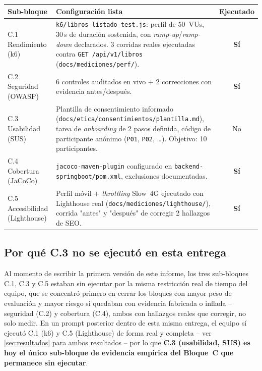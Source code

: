 \documentclass[12pt,a4paper]{article}
\begin{document}
\begin{center}
\small
\begin{tabularx}{\linewidth}{|l|X|c|}
\hline
\rowcolor{verdeuteq}
\color{white}\textbf{Sub-bloque} & \color{white}\textbf{Configuración lista} & \color{white}\textbf{Ejecutado} \\
\hline
C.1 Rendimiento (k6) & \texttt{k6/libros-listado-test.js}: perfil de 50~VUs, 30\,s de duración sostenida, con \emph{ramp-up}/\emph{ramp-down} declarados. 3 corridas reales ejecutadas contra \texttt{GET /api/v1/libros} (\texttt{docs/mediciones/perf/}). & \textbf{Sí} \\
\hline
C.2 Seguridad (OWASP) & 6 controles auditados en vivo + 2 correcciones con evidencia antes/después. & \textbf{Sí} \\
\hline
C.3 Usabilidad (SUS) & Plantilla de consentimiento informado (\texttt{docs/etica/consentimientos/plantilla.md}), tarea de \emph{onboarding} de 2 pasos definida, código de participante anónimo (\texttt{P01}, \texttt{P02}, \ldots). Objetivo: 10 participantes. & No \\
\hline
C.4 Cobertura (JaCoCo) & \texttt{jacoco-maven-plugin} configurado en \texttt{backend-springboot/pom.xml}, exclusiones documentadas. & \textbf{Sí} \\
\hline
C.5 Accesibilidad (Lighthouse) & Perfil móvil + \emph{throttling} Slow~4G ejecutado con Lighthouse real (\texttt{docs/mediciones/lighthouse/}), corrida "antes" y "después" de corregir 2 hallazgos de SEO. & \textbf{Sí} \\
\hline
\end{tabularx}
\end{center}

\subsection{Por qué C.3 no se ejecutó en esta entrega}

Al momento de escribir la primera versión de este informe, los tres
sub-bloques C.1, C.3 y C.5 estaban sin ejecutar por la misma restricción
real de tiempo del equipo, que se concentró primero en cerrar los bloques
con mayor peso de evaluación y mayor riesgo si quedaban con evidencia
fabricada o inflada -- seguridad (C.2) y cobertura (C.4), ambos con
hallazgos reales que corregir, no solo medir. En un prompt posterior
dentro de esta misma entrega, el equipo sí ejecutó C.1 (k6) y C.5
(Lighthouse) de forma real y completa -- ver
\autoref{sec:resultados} para ambos resultados -- por lo que
\textbf{C.3 (usabilidad, SUS) es hoy el único sub-bloque de evidencia
empírica del Bloque~C que permanece sin ejecutar}.
\end{document}
